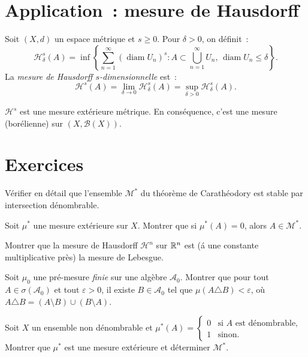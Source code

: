 \section{Application~: mesure de Hausdorff}

\begin{definition}
Soit $(X, d)$ un espace m\'etrique et $s \geq 0$. Pour $\delta > 0$, on d\'efinit~:
\[
\mathcal{H}^s_\delta(A) = \inf\left\{\sum_{n=1}^{\infty} (\operatorname{diam}
U_n)^s : A \subset \bigcup_{n=1}^{\infty} U_n,\,
\operatorname{diam} U_n \leq \delta\right\}.
\]
La \emph{mesure de Hausdorff $s$-dimensionnelle} est~:
\[
\mathcal{H}^s(A) = \lim_{\delta \to 0} \mathcal{H}^s_\delta(A) =
\sup_{\delta > 0} \mathcal{H}^s_\delta(A).
\]
\end{definition}

\begin{proposition}
$\mathcal{H}^s$ est une mesure ext\'erieure m\'etrique. En cons\'equence, c'est une
mesure (bor\'elienne) sur $(X, \mathcal{B}(X))$.
\end{proposition}

\section{Exercices}

\begin{exercice}
V\'erifier en d\'etail que l'ensemble $\mathcal{M}^*$ du th\'eor\`eme de Carath\'eodory
est stable par intersection d\'enombrable.
\end{exercice}

\begin{exercice}
Soit $\mu^*$ une mesure ext\'erieure sur $X$. Montrer que si $\mu^*(A) = 0$, alors
$A \in \mathcal{M}^*$.
\end{exercice}

\begin{exercice}
Montrer que la mesure de Hausdorff $\mathcal{H}^n$ sur $\mathbb{R}^n$ est (\'a une constante
multiplicative pr\`es) la mesure de Lebesgue.
\end{exercice}

\begin{exercice}
Soit $\mu_0$ une pr\'e-mesure \emph{finie} sur une alg\`ebre $\mathcal{A}_0$.
Montrer que pour tout $A \in \sigma(\mathcal{A}_0)$ et tout $\varepsilon > 0$,
il existe $B \in \mathcal{A}_0$ tel que $\mu(A \triangle B) < \varepsilon$, o\`u
$A \triangle B = (A \setminus B) \cup (B \setminus A)$.
\end{exercice}

\begin{exercice}
Soit $X$ un ensemble non d\'enombrable et
$\mu^*(A) = \begin{cases} 0 & \text{si } A \text{ est d\'enombrable,} \\
1 & \text{sinon.} \end{cases}$
Montrer que $\mu^*$ est une mesure ext\'erieure et d\'eterminer $\mathcal{M}^*$.
\end{exercice}
